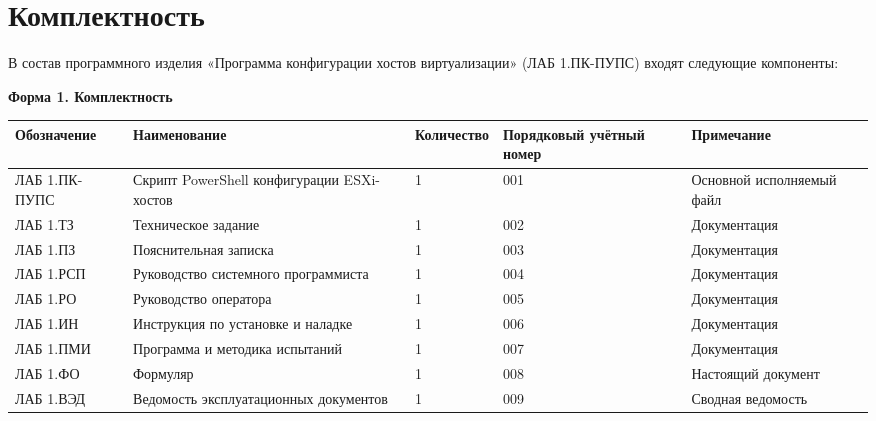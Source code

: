 \newpage
\section{Комплектность}

В состав программного изделия «Программа конфигурации хостов виртуализации» (ЛАБ 1.ПК-ПУПС) входят следующие компоненты:

\begin{center}
\textbf{Форма 1. Комплектность}
\end{center}

\begin{tabular}{|p{4cm}|p{5.5cm}|p{2cm}|p{3cm}|p{2.5cm}|}
\hline
\textbf{Обозначение} & \textbf{Наименование} & \textbf{Количество} & \textbf{Порядковый учётный номер} & \textbf{Примечание} \\
\hline
ЛАБ 1.ПК-ПУПС & Скрипт PowerShell конфигурации ESXi-хостов & 1 & 001 & Основной исполняемый файл \\
\hline
ЛАБ 1.ТЗ & Техническое задание & 1 & 002 & Документация \\
\hline
ЛАБ 1.ПЗ & Пояснительная записка & 1 & 003 & Документация \\
\hline
ЛАБ 1.РСП & Руководство системного программиста & 1 & 004 & Документация \\
\hline
ЛАБ 1.РО & Руководство оператора & 1 & 005 & Документация \\
\hline
ЛАБ 1.ИН & Инструкция по установке и наладке & 1 & 006 & Документация \\
\hline
ЛАБ 1.ПМИ & Программа и методика испытаний & 1 & 007 & Документация \\
\hline
ЛАБ 1.ФО & Формуляр & 1 & 008 & Настоящий документ \\
\hline
ЛАБ 1.ВЭД & Ведомость эксплуатационных документов & 1 & 009 & Сводная ведомость \\
\hline
\end{tabular}


\newpage
